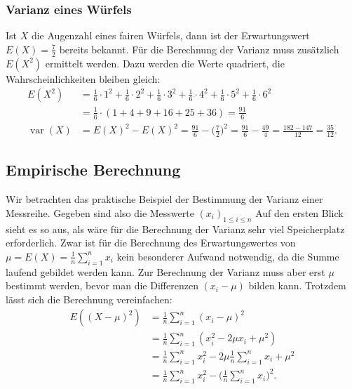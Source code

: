 \subsubsection{Varianz eines Würfels}
Ist $X$ die Augenzahl eines fairen Würfels, dann ist der
Erwartungswert  $E(X)=\frac{7}2$ bereits bekannt.
Für die Berechnung der Varianz muss zusätzlich $E(X^2)$ ermittelt
werden.
Dazu werden die Werte quadriert, die Wahrscheinlichkeiten bleiben gleich:
\begin{align*}
E(X^2)
&=
\frac16 \cdot 1^2
+
\frac16 \cdot 2^2
+
\frac16 \cdot 3^2
+
\frac16 \cdot 4^2
+
\frac16 \cdot 5^2
+
\frac16 \cdot 6^2
\\
&=
\frac16\cdot( 1+4+9+16+25+36)
=
\frac{91}{6}
\\
\operatorname{var}(X)
&=
E(X)^2-E(X)^2
=
\frac{91}{6}-\biggl(\frac{7}{2}\biggr)^2
=
\frac{91}{6}-\frac{49}{4}
=
\frac{182-147}{12}=\frac{35}{12}.
\end{align*}

\subsection{Empirische Berechnung}
Wir betrachten das praktische Beispiel der Bestimmung der Varianz
einer Messreihe.
Gegeben sind also die Messwerte $(x_i)_{1\le i\le n}$
Auf den ersten Blick sieht es so aus, als wäre für die Berechnung der Varianz
sehr viel Speicherplatz erforderlich.
Zwar ist für die Berechnung des
Erwartungswertes von $\mu=E(X)=\frac1n\sum_{i=1}^n x_i$ kein besonderer Aufwand
notwendig, da die Summe laufend gebildet werden kann.
Zur Berechnung der
Varianz muss aber erst $\mu$ bestimmt werden, bevor man die Differenzen $(x_i-\mu)$
bilden kann.
Trotzdem lässt sich die Berechnung vereinfachen:
\begin{align*}
E((X-\mu)^2)&=\frac1n\sum_{i=1}^n(x_i-\mu)^2\\
&=\frac1n\sum_{i=1}^n(x_i^2-2\mu x_i+\mu^2)\\
&=\frac1n\sum_{i=1}^nx_i^2-2\mu\frac1n\sum_{i=1}^n x_i+\mu^2\\
&=\frac1n\sum_{i=1}^nx_i^2-\biggl(\frac1n\sum_{i=1}^nx_i\biggr)^2.
\end{align*}
